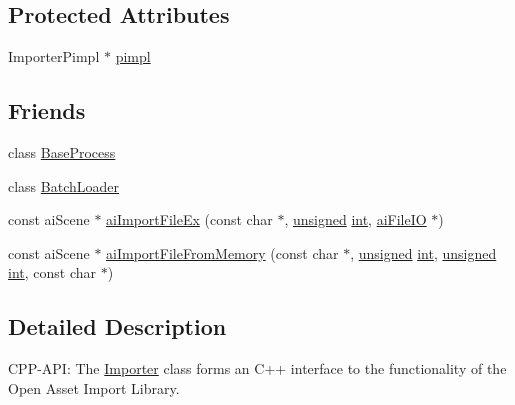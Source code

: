 \subsection*{Protected Attributes}
\begin{DoxyCompactItemize}
\item 
Importer\-Pimpl $\ast$ \hyperlink{class_assimp_1_1_importer_a3928bb8d375fd676dd5dbe33382e46ce}{pimpl}
\end{DoxyCompactItemize}
\subsection*{Friends}
\begin{DoxyCompactItemize}
\item 
class \hyperlink{class_assimp_1_1_importer_a7624adc48d8bacb15f1f29efa2c9c63b}{Base\-Process}
\item 
class \hyperlink{class_assimp_1_1_importer_a5fea0896b948727f91147b236db38086}{Batch\-Loader}
\item 
const ai\-Scene $\ast$ \hyperlink{class_assimp_1_1_importer_af625a61cb616962fa3ba3475843709a0}{ai\-Import\-File\-Ex} (const char $\ast$, \hyperlink{_free_image_8h_a425076c7067a1b5166e2cc530e914814}{unsigned} \hyperlink{wglew_8h_a500a82aecba06f4550f6849b8099ca21}{int}, \hyperlink{structai_file_i_o}{ai\-File\-I\-O} $\ast$)
\item 
const ai\-Scene $\ast$ \hyperlink{class_assimp_1_1_importer_abeab099f57452e48c11077a2fffdc08a}{ai\-Import\-File\-From\-Memory} (const char $\ast$, \hyperlink{_free_image_8h_a425076c7067a1b5166e2cc530e914814}{unsigned} \hyperlink{wglew_8h_a500a82aecba06f4550f6849b8099ca21}{int}, \hyperlink{_free_image_8h_a425076c7067a1b5166e2cc530e914814}{unsigned} \hyperlink{wglew_8h_a500a82aecba06f4550f6849b8099ca21}{int}, const char $\ast$)
\end{DoxyCompactItemize}


\subsection{Detailed Description}
C\-P\-P-\/\-A\-P\-I\-: The \hyperlink{class_assimp_1_1_importer}{Importer} class forms an C++ interface to the functionality of the Open Asset Import Library.

